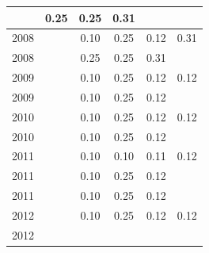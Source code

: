 \begin{table}[H]
\begin{tabular}{| l | c | c | c | c | c |}
          &
          0.25
          &
          0.25
          &
          0.31
          &
          \\
\hline
            2008
          &
          
          &
          0.10
          &
          0.25
          &
          0.12
          &
            {\color{red} 0.31}
          \\
            2008
          &
          
          &
          0.25
          &
          0.25
          &
          0.31
          &
          \\
\hline
            2009
          &
          
          &
          0.10
          &
          0.25
          &
          0.12
          &
            {\color{red} 0.12}
          \\
            2009
          &
          
          &
          0.10
          &
          0.25
          &
          0.12
          &
          \\
\hline
            2010
          &
          
          &
          0.10
          &
          0.25
          &
          0.12
          &
            {\color{red} 0.12}
          \\
            2010
          &
          
          &
          0.10
          &
          0.25
          &
          0.12
          &
          \\
\hline
            2011
          &
          
          &
          0.10
          &
          0.10
          &
          0.11
          &
            {\color{red} 0.12}
          \\
            2011
          &
          
          &
          0.10
          &
          0.25
          &
          0.12
          &
          \\
            2011
          &
          
          &
          0.10
          &
          0.25
          &
          0.12
          &
          \\
\hline
            2012
          &
          
          &
          0.10
          &
          0.25
          &
          0.12
          &
            {\color{red} 0.12}
          \\
            2012
          &
          

\end{tabular}
\end{table}
